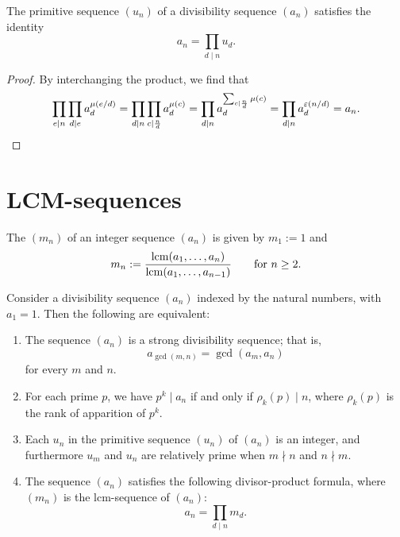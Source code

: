 \begin{theorem}
  The primitive sequence $(u_n)$ of a divisibility sequence $(a_n)$ satisfies the identity
  \begin{equation*}
    a_n=\prod_{d\mid n} u_d.
  \end{equation*}
\end{theorem}

\begin{proof}
  By interchanging the product, we find that
  \begin{equation*}
    \prod_{e\mid n}\prod_{d\mid e} a_{d}^{\mu(e/d)}=\prod_{d\mid n}\prod_{c\mid\frac{n}{d}} a_{d}^{\mu(c)}=\prod_{d\mid n}a_d^{\sum_{c\mid\frac{n}{d}}\mu(c)}=\prod_{d\mid n}a_d^{\varepsilon(n/d)}=a_n. \qedhere
  \end{equation*}
\end{proof}

\section{LCM-sequences}

\begin{definition}
  The  $(m_n)$ of an integer sequence $(a_n)$ is given by $m_1:=1$ and
  \begin{equation*}
    m_n := \frac{\operatorname*{lcm}(a_1,\ldots,a_n)}{\operatorname*{lcm}(a_1,\ldots,a_{n-1})}\qquad\text{for $n\geq 2$}.
  \end{equation*}
\end{definition}

\begin{theorem}
  Consider a divisibility sequence $(a_n)$ indexed by the natural numbers, with $a_1=1$. Then the following are equivalent:
  \begin{enumerate}
  \item The sequence $(a_n)$ is a strong divisibility sequence; that is,
    \begin{equation*}
      a_{\gcd(m,n)}=\gcd(a_m,a_n)
    \end{equation*}
    for every $m$ and $n$.
  \item \textup{\cite{ward1936}} For each prime $p$, we have $p^k\mid a_n$ if and only if $\rho_k(p)\mid n$, where $\rho_k(p)$ is the rank of apparition of $p^k$.
  \item Each $u_n$ in the primitive sequence $(u_n)$ of $(a_n)$ is an integer, and furthermore $u_m$ and $u_n$ are relatively prime when $m\nmid n$ and $n\nmid m$.
  \item \textup{\cite{nowicki2015}} The sequence $(a_n)$ satisfies the following divisor-product formula, where $(m_n)$ is the lcm-sequence of $(a_n)$:
    \begin{equation*}
      a_n = \prod_{d\mid n}m_d.
    \end{equation*}
  \end{enumerate}
\end{theorem}

